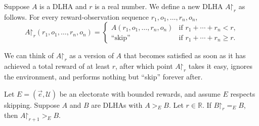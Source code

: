 \documentclass[twoside,11pt]{article}
\begin{document}
\begin{definition}
Suppose $A$ is a DLHA and $r$ is a real number.
We define a new DLHA $A\mathord{\restriction}_r$ as follows.
For every reward-observation sequence $r_1,o_1,\ldots,r_n,o_n$,
\[
A\mathord{\restriction}_r(r_1,o_1,\ldots,r_n,o_n)
=
\begin{cases}
    A(r_1,o_1,\ldots,r_n,o_n) & \mbox{if $r_1+\cdots+r_n<r$,}\\
    \mbox{``skip''} & \mbox{if $r_1+\cdots+r_n\geq r$.}
\end{cases}
\]
\end{definition}

We can think of $A\mathord{\restriction}_r$ as a version
of $A$ that becomes satisfied as soon as it
has achieved a total reward of at least $r$, after which
point $A\mathord{\restriction}_r$ takes it easy, ignores the environment,
and performs nothing but ``skip'' forever after.

\begin{proposition}
\label{quitterproposition}
Let $E=(\vec{e},\mathscr U)$ be an electorate with bounded rewards, and assume
$E$ respects skipping.
Suppose $A$ and $B$ are DLHAs with $A>_{E}B$. Let $r\in\mathbb R$.
If $B\mathord{\restriction}_r=_{E}B$, then $A\mathord{\restriction}_{r+1}>_{E}B$.
\end{proposition}
\end{document}
